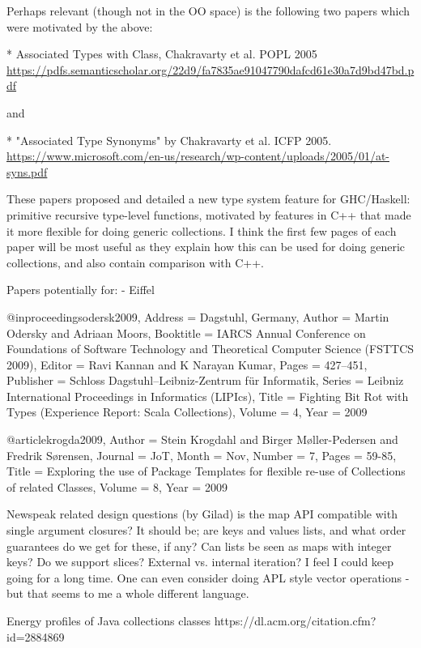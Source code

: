 \documentclass[sigconf, 10pt]{acmart}
\begin{document}
\begin{note}
Perhaps relevant (though not in the OO space) is the following two papers which were motivated by the above:

* Associated Types with Class, Chakravarty et al. POPL 2005
\url{https://pdfs.semanticscholar.org/22d9/fa7835ae91047790dafcd61e30a7d9bd47bd.pdf}

and

* "Associated Type Synonyms" by Chakravarty et al. ICFP 2005.
\url{https://www.microsoft.com/en-us/research/wp-content/uploads/2005/01/at-syns.pdf}

These papers proposed and detailed a new type system feature for GHC/Haskell: primitive recursive type-level functions, motivated by features in C++ that made it more flexible for doing generic collections. I think the first few pages of each paper will be most useful as they explain how this can be used for doing generic collections, and also contain comparison with C++.

Papers potentially for:
 - Eiffel

@inproceedings{odersk2009,
	Address = {Dagstuhl, Germany},
	Author = {Martin Odersky and Adriaan Moors},
	Booktitle = {IARCS Annual Conference on Foundations of Software Technology and Theoretical Computer Science (FSTTCS 2009)},
	Editor = {Ravi Kannan and K Narayan Kumar},
	Pages = {427--451},
	Publisher = {Schloss Dagstuhl--Leibniz-Zentrum {f\"{u}r} Informatik},
	Series = {Leibniz International Proceedings in Informatics (LIPIcs)},
	Title = {Fighting Bit Rot with Types (Experience Report: Scala Collections)},
	Volume = {4},
	Year = {2009}}

@article{krogda2009,
	Author = {Stein Krogdahl and Birger M{\o}ller-Pedersen and Fredrik S{\o}rensen},
	Journal = {JoT},
	Month = {Nov},
	Number = {7},
	Pages = {59-85},
	Title = {Exploring the use of Package Templates for flexible re-use of Collections of related Classes},
	Volume = {8},
	Year = {2009}}
  
  
Newspeak related design questions (by Gilad)
is the map API compatible with single argument closures? It should be; are keys and values lists, and what order guarantees do we get for these, if any? Can lists be seen as maps with integer keys? Do we support slices? External vs. internal iteration? I feel I could keep going for a long time. One can even consider doing APL style vector operations - but that seems to me a whole different language.


Energy profiles of Java collections classes
https://dl.acm.org/citation.cfm?id=2884869


\end{note}
\end{document}
